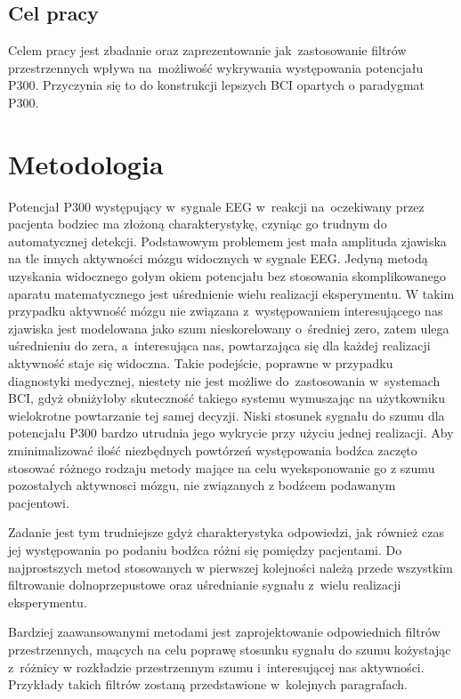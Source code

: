 \documentclass[licencjacka,openright]{pracamgr}
\begin{document}
\section{Cel pracy}

Celem pracy jest zbadanie oraz zaprezentowanie jak~zastosowanie filtrów przestrzennych wpływa na~możliwość wykrywania występowania potencjału P300. Przyczynia się to do konstrukcji lepszych BCI opartych o paradygmat P300.



\chapter{Metodologia}
Potencjał P300 występujący w~sygnale EEG w~reakcji na~oczekiwany przez pacjenta bodziec ma złożoną charakterystykę, czyniąc go trudnym do automatycznej detekcji. Podstawowym problemem jest mała amplituda zjawiska na tle innych aktywności mózgu widocznych w sygnale EEG. Jedyną metodą uzyskania widocznego gołym okiem potencjału bez stosowania skomplikowanego aparatu matematycznego jest uśrednienie wielu realizacji eksperymentu. W takim przypadku aktywność mózgu nie związana z~występowaniem interesującego nas zjawiska jest modelowana jako szum nieskorelowany o~średniej zero, zatem ulega uśrednieniu do zera, a~interesująca nas, powtarzająca się dla każdej realizacji aktywność staje się widoczna. Takie podejście, poprawne w przypadku diagnostyki medycznej, niestety nie jest możliwe do~zastosowania w~systemach BCI, gdyż obniżyłoby skuteczność takiego systemu wymuszając na użytkowniku wielokrotne powtarzanie tej samej decyzji. Niski stosunek sygnału do szumu dla potencjału P300 bardzo utrudnia jego wykrycie przy użyciu jednej realizacji. Aby zminimalizować ilość niezbędnych powtórzeń występowania bodźca zaczęto stosować różnego rodzaju metody mające na celu wyeksponowanie go z szumu pozostałych aktywnosci mózgu, nie związanych z bodźcem podawanym pacjentowi.

Zadanie jest tym trudniejsze gdyż charakterystyka odpowiedzi, jak również czas jej występowania po podaniu bodźca różni się pomiędzy pacjentami. Do najprostszych metod stosowanych w pierwszej kolejności należą przede wszystkim filtrowanie dolnoprzepustowe oraz uśrednianie sygnału z~wielu realizacji eksperymentu.

Bardziej zaawansowanymi metodami jest zaprojektowanie odpowiednich filtrów przestrzennych, maących na celu poprawę stosunku sygnału do szumu kożystając z~różnicy w rozkładzie przestrzennym szumu i~interesującej nas aktywności. Przykłady takich filtrów zostaną przedstawione w~kolejnych paragrafach.
\end{document}

